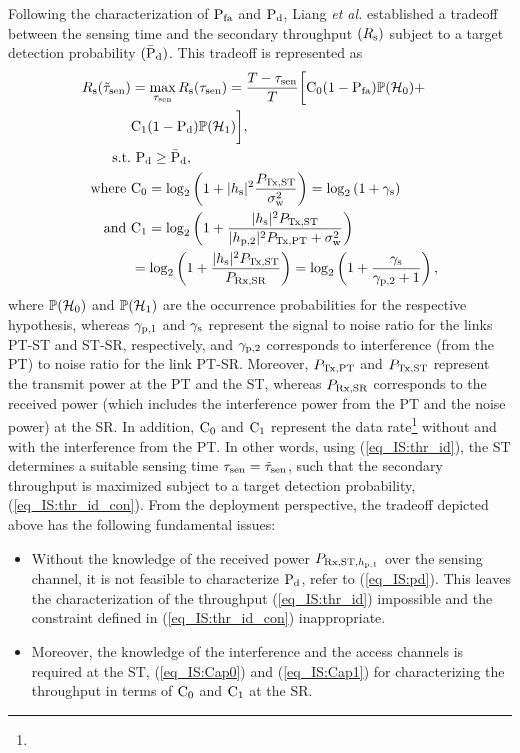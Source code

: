 Following the characterization of $\text{P}_{\text{fa}}$ and $\text{P}_{\text{d}}$, Liang \textit{et al.} \cite{Liang08} established a tradeoff between the sensing time and the secondary throughput $(R_{\text{s}})$ subject to a target detection probability $(\bar{\text{P}}_{\text{d}})$. This tradeoff is represented as  
\begin{align}
R_{\text{s}}(\tilde{\tau}_{\text{sen}}) &= \operatorname*{max}_{\tau_{\text{sen}}} R_{\text{s}}(\tau_{\text{sen}}) = \frac{T- \tau_{\text{sen}}}{T} \bigg[ \text{C}_{\text{0}} (1 - \text{P}_{\text{fa}}) \mathbb P(\mathcal{H}_0) + \nonumber \\ \quad & \text{C}_{\text{1}} (1 - \text{P}_{\text{d}}) \mathbb P(\mathcal{H}_1)  \bigg], \label{eq_IS:thr_id} \\
\text{s.t.} & \text{ } \text{P}_{\text{d}} \ge \bar{\text{P}}_{\text{d}}, \label{eq_IS:thr_id_con} \\ 
\text{where } & \text{C}_{\text{0}} = \log_2 \left(1 + |h_{\text{s}}|^2 \frac{P_{\text{Tx,ST}}}{\sigma^2_{\text{w}}}\right) = \log_2 \left( 1 + {\gamma}_{\text{s}} \right) \label{eq_IS:Cap0}\\ 
{\text{ and }} & \text{C}_{\text{1}} = \log_2 \left(1 + \frac{|h_{\text{s}}|^2 P_{\text{Tx,ST}} }{|h_{\text{p,2}}|^2 P_{\text{Tx,PT}}  + \sigma^2_{\text{w}}} \right) \nonumber \\ \quad & = \log_2 \left(1 + \frac{|h_{\text{s}}|^2 P_{\text{Tx,ST}} }{P_{\text{Rx,SR}}} \right) = \log_2 \left(1 + \frac{{\gamma}_{\text{s}}}{{\gamma}_{\text{p,2}} + 1}  \right), \label{eq_IS:Cap1} 
\end{align}
where $\mathbb P(\mathcal{H}_0)$ and $\mathbb P(\mathcal{H}_1)$ are the occurrence probabilities for the respective hypothesis, whereas ${\gamma}_{\text{p,1}}$ and ${\gamma}_{\text{s}}$ represent the signal to noise ratio for the links PT-ST and ST-SR, respectively, and ${\gamma}_{\text{p,2}}$ corresponds to interference (from the PT) to noise ratio for the link PT-SR. Moreover, $P_{\text{Tx,PT}}$ and $P_{\text{Tx,ST}}$ represent the transmit power at the PT and the ST, whereas $P_{\text{Rx,SR}}$ corresponds to the received power (which includes the interference power from the PT and the noise power) at the SR. In addition, $\text{C}_{\text{0}}$ and $\text{C}_{\text{1}}$ represent the data rate\footnote{} without and with the interference from the PT. In other words, using (\ref{eq_IS:thr_id}), the ST determines a suitable sensing time $\tau_{\text{sen}} = \tilde{\tau}_{\text{sen}}$, such that the secondary throughput is maximized subject to a target detection probability,  (\ref{eq_IS:thr_id_con}). From the deployment perspective, the tradeoff depicted above has the following fundamental issues:
\begin{itemize}
\item Without the knowledge of the received power $P_{\text{Rx,ST,$h_{\text{p,1}}$}}$ over the sensing channel, it is not feasible to characterize $\text{P}_{\text{d}}$, refer to (\ref{eq_IS:pd}). This leaves the characterization of the throughput (\ref{eq_IS:thr_id}) impossible and the constraint defined in (\ref{eq_IS:thr_id_con}) inappropriate. 
\item Moreover, the knowledge of the interference and the access channels is required at the ST,  (\ref{eq_IS:Cap0}) and (\ref{eq_IS:Cap1}) for characterizing the throughput in terms of $\text{C}_{\text{0}}$ and $\text{C}_{\text{1}}$ at the SR. 
\end{itemize}
